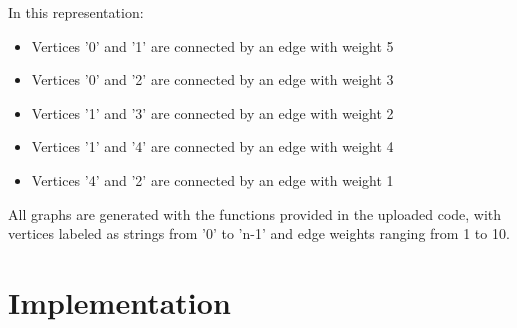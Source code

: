 \documentclass[a4paper,12pt]{article}
\begin{document}
In this representation:
\begin{itemize}
\item Vertices '0' and '1' are connected by an edge with weight 5
\item Vertices '0' and '2' are connected by an edge with weight 3
\item Vertices '1' and '3' are connected by an edge with weight 2
\item Vertices '1' and '4' are connected by an edge with weight 4
\item Vertices '4' and '2' are connected by an edge with weight 1
\end{itemize}

All graphs are generated with the functions provided in the uploaded code, with vertices labeled as strings from '0' to 'n-1' and edge weights ranging from 1 to 10.
\section{Implementation}
\label{sec:orgd9d1a1b}
\end{document}
